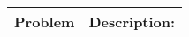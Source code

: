 \begin{summary}
    \begin{center}
        \begin{tabular}{ll}
            \toprule
            \textbf{Problem} & \textbf{Description:} \\
            \midrule

\end{tabular}
\end{center}
\end{summary}
